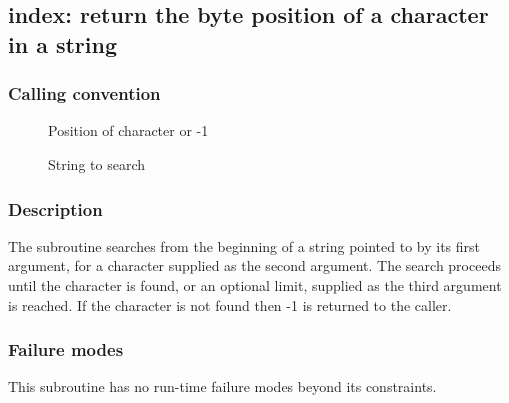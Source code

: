 \clearpage
{}
{}
\label{subr:index}
\subsection*{index: return the byte position of a character in a string}

\subsubsection*{Calling convention}

\begin{description}
\item[] Position of character or -1 
\item[] String to search 
\end{description}

\subsubsection*{Description}

The  subroutine searches from the beginning of a
string pointed to by its first argument, for a character supplied as
the second argument.  The search proceeds until the character is
found, or an optional limit, supplied as the third argument is
reached.  If the character is not found then -1 is returned to the
caller.

\subsubsection*{Failure modes}

This subroutine has no run-time failure modes beyond its constraints.
